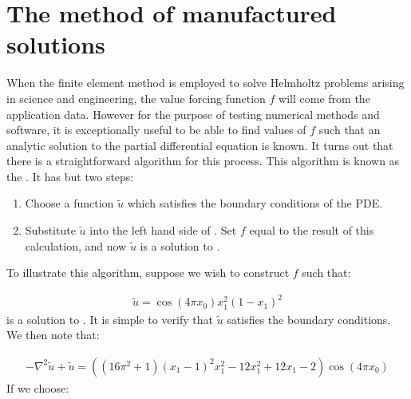 \documentclass{book}
\begin{document}
\section{The method of manufactured solutions}
\label{\detokenize{6_finite_element_problems:the-method-of-manufactured-solutions}}
When the finite element method is employed to solve Helmholtz problems
arising in science and engineering, the value forcing function \(f\)
will come from the application data. However for the purpose of
testing numerical methods and software, it is exceptionally useful to
be able to find values of \(f\) such that an analytic solution to the
partial differential equation is known. It turns out that there is a
straightforward algorithm for this process. This algorithm is known as
the . It has but two steps:
\begin{enumerate}
\item {} 
Choose a function \(\tilde{u}\) which satisfies the boundary
conditions of the PDE.

\item {} 
Substitute \(\tilde{u}\) into the left hand side of
{\hyperref[\detokenize{6_finite_element_problems:equation-helmholtz}]{}}. Set \(f\) equal to the result of this calculation,
and now \(\tilde{u}\) is a solution to {\hyperref[\detokenize{6_finite_element_problems:equation-helmholtz}]{}}.

\end{enumerate}

To illustrate this algorithm, suppose we wish to construct \(f\) such that:

\label{\detokenize{6_finite_element_problems:equation-6_finite_element_problems:11}}\begin{equation}\label{equation:6_finite_element_problems:6_finite_element_problems:11}
\begin{split}\tilde{u} = \cos(4\pi x_0) x_1^2(1 - x_1)^2\end{split}
\end{equation}
is a solution to {\hyperref[\detokenize{6_finite_element_problems:equation-helmholtz}]{}}. It is simple to verify that
\(\tilde{u}\) satisfies the boundary conditions. We then note that:

\label{\detokenize{6_finite_element_problems:equation-6_finite_element_problems:12}}\begin{equation}\label{equation:6_finite_element_problems:6_finite_element_problems:12}
\begin{split}- \nabla^2 \tilde{u} + \tilde{u} = \left((16 \pi^2 + 1) (x_1 - 1)^2 x_1^2 - 12 x_1^2  +12 x_1  - 2\right) \cos(4 \pi x_0)\end{split}
\end{equation}
If we choose:
\end{document}
